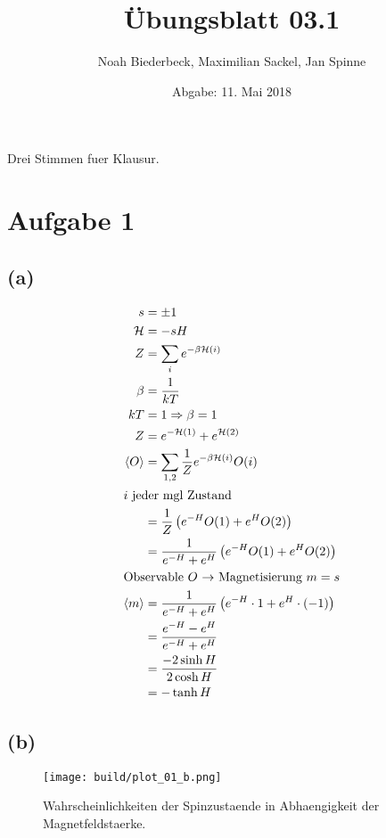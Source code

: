 \documentclass{scrartcl}
\title{Übungsblatt 03.1}
\author{%
  Noah Biederbeck, Maximilian Sackel, Jan Spinne
}
\date{Abgabe: 11. Mai 2018}
\begin{document}
\maketitle

Drei Stimmen fuer Klausur.

\section*{Aufgabe 1}
\subsection*{(a)}
\begin{align*}
  s &= \pm 1 \\
  \mathcal{H} &= -sH \\
  Z &= \sum_i e^{-\beta \mathcal{H}(i)} \\
  \beta &= \frac{1}{kT} \\
  kT &= 1 \Rightarrow \beta = 1 \\
  Z &= e^{-\mathcal{H}(1)} + e^{\mathcal{H}(2)} \\
  \left<O\right> &= \sum_{1, 2} \frac{1}{Z} e^{-\beta \mathcal{H} (i)} O(i) \\
  \intertext{$i$ jeder mgl Zustand}
                 &= \frac{1}{Z} \left( e^{-H} O(1) + e^H  O(2) \right)\\
                 &= \frac{1}{e^{-H} + e^H} \left( e^{-H} O(1) + e^H  O(2) \right) \\
  \intertext{Observable $O$ $\rightarrow$ Magnetisierung $m = s$}
  \left<m\right> &= \frac{1}{e^{-H} + e^H} \left( e^{-H} \cdot 1 + e^H \cdot (-1) \right)\\
                 &= \frac{e^{-H} - e^H}{e^{-H} + e^H} \\
                 &= \frac{-2 \sinh{H}}{2 \cosh{H}} \\
                 &= -\tanh{H}
\end{align*}

\subsection*{(b)}
\begin{figure}[ht]
  \centering
  \texttt{[image: build/plot\_01\_b.png]}
  \caption{%
    Wahrscheinlichkeiten der Spinzustaende in Abhaengigkeit der Magnetfeldstaerke.%
  }%
  \label{fig:plot_01_b}
\end{figure}
\end{document}
